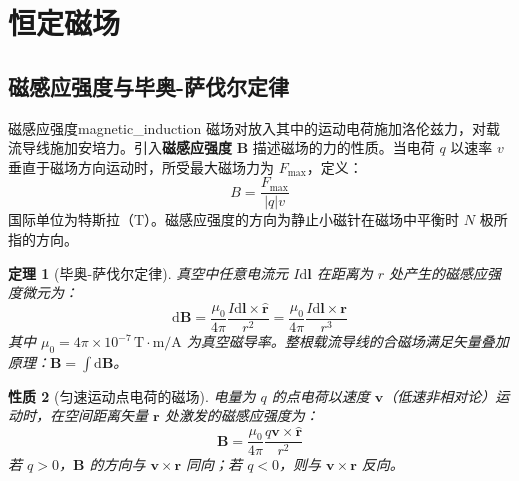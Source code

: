 \documentclass[11pt,a4paper,fontset=fandol]{ctexart}
\newtheorem{theorem}{定理}[section]
\newtheorem{property}[theorem]{性质}
\theoremstyle{remark}
\begin{document}
\newpage

\section{恒定磁场}

\subsection{磁感应强度与毕奥-萨伐尔定律}

\begin{definition}{磁感应强度}{magnetic_induction}
磁场对放入其中的运动电荷施加洛伦兹力，对载流导线施加安培力。引入\textbf{磁感应强度} $\bm{B}$ 描述磁场的力的性质。当电荷 $q$ 以速率 $v$ 垂直于磁场方向运动时，所受最大磁场力为 $F_{\max}$，定义：
\begin{equation}
    B = \frac{F_{\max}}{|q|v}
\end{equation}
国际单位为特斯拉（$\mathrm{T}$）。磁感应强度的方向为静止小磁针在磁场中平衡时 $N$ 极所指的方向。
\end{definition}

\begin{theorem}[毕奥-萨伐尔定律]
真空中任意电流元 $I\mathrm{d}\bm{l}$ 在距离为 $r$ 处产生的磁感应强度微元为：
\begin{equation}
    \mathrm{d}\bm{B} = \frac{\mu_0}{4\pi}\frac{I\mathrm{d}\bm{l} \times \hat{\bm{r}}}{r^2} = \frac{\mu_0}{4\pi}\frac{I\mathrm{d}\bm{l} \times \bm{r}}{r^3}
\end{equation}
其中 $\mu_0 = 4\pi \times 10^{-7}\,\mathrm{T\cdot m/A}$ 为真空磁导率。整根载流导线的合磁场满足矢量叠加原理：$\bm{B} = \int \mathrm{d}\bm{B}$。
\end{theorem}

\begin{property}[匀速运动点电荷的磁场]
电量为 $q$ 的点电荷以速度 $\bm{v}$（低速非相对论）运动时，在空间距离矢量 $\bm{r}$ 处激发的磁感应强度为：
\begin{equation}
    \bm{B} = \frac{\mu_0}{4\pi}\frac{q\bm{v} \times \hat{\bm{r}}}{r^2}
\end{equation}
若 $q>0$，$\bm{B}$ 的方向与 $\bm{v}\times\bm{r}$ 同向；若 $q<0$，则与 $\bm{v}\times\bm{r}$ 反向。
\end{property}
\end{document}
